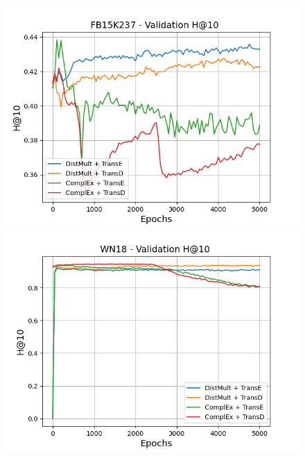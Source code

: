 \begin{figure}
    \begin{minipage}{.3\textwidth}
      \centering
      \includegraphics[width=\linewidth]{figures/results/gan_train/pretrained/uncertainty/max/entropy/fb15k237/5k_epochs/uncertainty_fb15k237_hit10.png}
    \end{minipage}%
     \begin{minipage}{.3\textwidth}
      \centering
      \includegraphics[width=0.9\linewidth]{figures/results/gan_train/pretrained/uncertainty/max/entropy/wn18/5k_epochs/uncertainty_wn18_hit10.png}
    \end{minipage}%
     \begin{minipage}{.3\textwidth}
      \centering

\end{minipage}
\end{figure}

